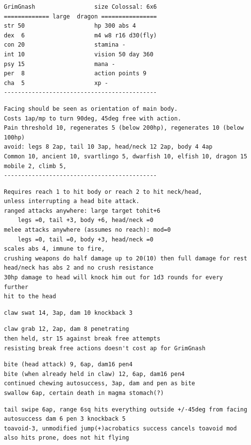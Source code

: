 \goodbreak \small \begin{samepage} \begin{verbatim}
GrimGnash                 size Colossal: 6x6
============= large  dragon ================
str 50                    hp 300 abs 4
dex  6                    m4 w8 r16 d30(fly)
con 20                    stamina -
int 10                    vision 50 day 360
psy 15                    mana -
per  8                    action points 9
cha  5                    xp -
--------------------------------------------
\end{verbatim} \goodbreak \begin{verbatim}
Facing should be seen as orientation of main body.
Costs 1ap/mp to turn 90deg, 45deg free with action.
Pain threshold 10, regenerates 5 (below 200hp), regenerates 10 (below 100hp)
avoid: legs 8 2ap, tail 10 3ap, head/neck 12 2ap, body 4 4ap
Common 10, ancient 10, svartlingo 5, dwarfish 10, elfish 10, dragon 15
mobile 2, climb 5, 
--------------------------------------------
\end{verbatim} \goodbreak \begin{verbatim}
Requires reach 1 to hit body or reach 2 to hit neck/head,
unless interrupting a head bite attack.
ranged attacks anywhere: large target tohit+6
    legs =0, tail +3, body +6, head/neck =0
melee attacks anywhere (assumes no reach): mod=0
    legs =0, tail =0, body +3, head/neck =0
scales abs 4, immune to fire, 
crushing weapons do half damage up to 20(10) then full damage for rest
head/neck has abs 2 and no crush resistance
30hp damage to head will knock him out for 1d3 rounds for every further
hit to the head

\end{verbatim} \goodbreak \begin{verbatim}
claw swat 14, 3ap, dam 10 knockback 3

\end{verbatim} \goodbreak \begin{verbatim}
claw grab 12, 2ap, dam 8 penetrating
then held, str 15 against break free attempts
resisting break free actions doesn't cost ap for GrimGnash

\end{verbatim} \goodbreak \begin{verbatim}
bite (head attack) 9, 6ap, dam16 pen4 
bite (when already held in claw) 12, 6ap, dam16 pen4
continued chewing autosuccess, 3ap, dam and pen as bite
swallow 6ap, certain death in magma stomach(?)

\end{verbatim} \goodbreak \begin{verbatim}
tail swipe 6ap, range 6sq hits everything outside +/-45deg from facing
autosuccess dam 6 pen 3 knockback 5
toavoid-3, unmodified jump(+)acrobatics success cancels toavoid mod
also hits prone, does not hit flying


\end{verbatim}
\end{samepage}
